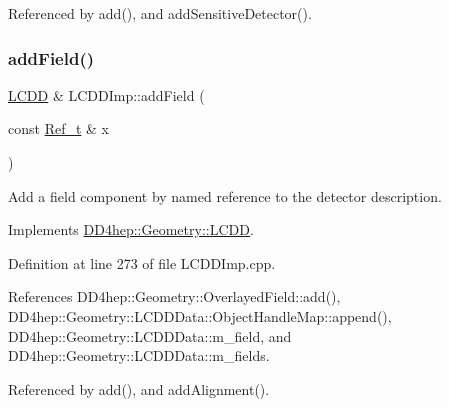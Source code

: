 Referenced by add(), and add\+Sensitive\+Detector().

\hypertarget{class_d_d4hep_1_1_geometry_1_1_l_c_d_d_imp_a94f5aafcc5fc95d0b15feb960f244019}{}\label{class_d_d4hep_1_1_geometry_1_1_l_c_d_d_imp_a94f5aafcc5fc95d0b15feb960f244019} 
\subsubsection{\texorpdfstring{add\+Field()}{addField()}}
{\footnotesize\ttfamily \hyperlink{class_d_d4hep_1_1_geometry_1_1_l_c_d_d}{L\+C\+DD} \& L\+C\+D\+D\+Imp\+::add\+Field (\begin{DoxyParamCaption}\item[{const \hyperlink{group___d_d4_h_e_p___g_e_o_m_e_t_r_y_ga40af83be6718bb8828a3d83dc7f8c930}{Ref\+\_\+t} \&}]{x }\end{DoxyParamCaption})\hspace{0.3cm}{\ttfamily [virtual]}}



Add a field component by named reference to the detector description. 



Implements \hyperlink{class_d_d4hep_1_1_geometry_1_1_l_c_d_d_a91ae6cfee73a663c46f296bc403b5c63}{D\+D4hep\+::\+Geometry\+::\+L\+C\+DD}.



Definition at line 273 of file L\+C\+D\+D\+Imp.\+cpp.



References D\+D4hep\+::\+Geometry\+::\+Overlayed\+Field\+::add(), D\+D4hep\+::\+Geometry\+::\+L\+C\+D\+D\+Data\+::\+Object\+Handle\+Map\+::append(), D\+D4hep\+::\+Geometry\+::\+L\+C\+D\+D\+Data\+::m\+\_\+field, and D\+D4hep\+::\+Geometry\+::\+L\+C\+D\+D\+Data\+::m\+\_\+fields.



Referenced by add(), and add\+Alignment().

\hypertarget{class_d_d4hep_1_1_geometry_1_1_l_c_d_d_imp_ac67bb4f3004262373f24c9f02431dbe0}{}\label{class_d_d4hep_1_1_geometry_1_1_l_c_d_d_imp_ac67bb4f3004262373f24c9f02431dbe0} 
